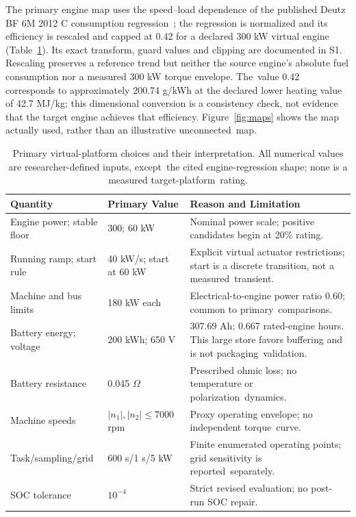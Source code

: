 \documentclass[energies,article,submit,moreauthors]{Definitions/mdpi}
\begin{document}
The primary engine map uses the speed--load dependence of the published Deutz BF 6M 2012 C consumption regression~\cite{devyanin2023}; the regression is normalized and its efficiency is rescaled and capped at 0.42 for a declared 300 kW virtual engine (Table~\ref{tab:parameters}). Its exact transform, guard values and clipping are documented in S1. Rescaling preserves a reference trend but neither the source engine's absolute fuel consumption nor a measured 300 kW torque envelope. The~value 0.42 corresponds to approximately 200.74 g/kWh at the declared lower heating value of 42.7 MJ/kg; this dimensional conversion is a consistency check, not evidence that the target engine achieves that efficiency. Figure~\ref{fig:maps} shows the map actually used, rather than an illustrative unconnected~map.

\begin{table}[H]
\caption{Primary
 virtual-platform choices and their interpretation. All numerical values are researcher-defined inputs, except~the cited engine-regression shape; none is a measured target-platform~rating.}\label{tab:parameters}
\small\begin{tabularx}{\linewidth}{@{}p{.24\linewidth}p{.22\linewidth}X@{}}\toprule
\textbf{Quantity} & \textbf{Primary Value} &\textbf{Reason and Limitation} \\\midrule
Engine power; stable floor & 300; 60 kW & Nominal power scale; positive candidates begin at 20\% rating. \\
Running ramp; start rule & 40 kW/s; start at 60 kW & Explicit virtual actuator restrictions; start is a discrete transition, not a measured~transient. \\
Machine and bus limits & 180 kW each & Electrical-to-engine power ratio 0.60; common to primary~comparisons. \\
Battery energy; voltage & 200 kWh; 650 V & 307.69 Ah; 0.667 rated-engine hours. This large store favors buffering and is not packaging~validation. \\
Battery resistance & 0.045 $\Omega$ & Prescribed ohmic loss; no temperature or polarization~dynamics. \\
Machine speeds & $|n_1|,|n_2|\leq7000$ rpm & Proxy operating envelope; no independent torque~curve. \\
Task/sampling/grid & 600 s/1 s/5 kW & Finite enumerated operating points; grid sensitivity is reported~separately. \\
SOC tolerance & $10^{-4}$ & Strict revised evaluation; no post-run SOC repair. \\\bottomrule
\end{tabularx}
\end{table}
\end{document}
